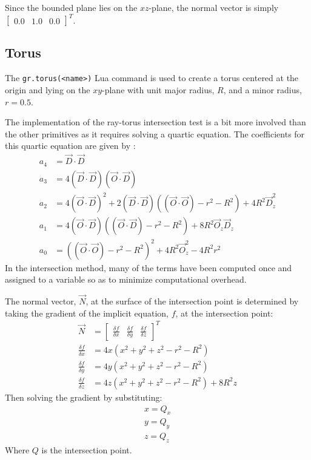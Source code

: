 Since the bounded plane lies on the $xz$-plane, the normal vector is simply
$\begin{bmatrix} 0.0 & 1.0 & 0.0
\end{bmatrix}^{T}$.

\subsection*{Torus}
The \verb|gr.torus(<name>)| Lua command is used to create a torus centered at
the origin and lying on the $xy$-plane with unit major radius, $R$, and a minor 
radius, $r = 0.5$.

The implementation of the ray-torus intersection test is a bit more involved
than the other primitives as it requires solving a quartic equation. The
coefficients for this quartic equation are given by \cite{13_wagner_2004}:
\begin{equation}
\begin{split}
  a_{4} &= \vec{D}\cdot\vec{D} \\
  a_{3} &= 4(\vec{D}\cdot\vec{D})(\vec{O}\cdot\vec{D}) \\
  a_{2} &= 4(\vec{O}\cdot\vec{D})^2 + 2(\vec{D}\cdot\vec{D})((\vec{O}\cdot
  \vec{O}) - r^2 - R^2) + 4R^2\vec{D}_{z}^2 \\
  a_{1} &= 4(\vec{O}\cdot\vec{D})((\vec{O}\cdot\vec{D}) - r^2 - R^2) +8R^2
  \vec{O}_{z}\vec{D}_{z} \\
  a_{0} &= ((\vec{O}\cdot\vec{O}) - r^2 - R^2)^2 + 4R^2\vec{O}_{z}^2 - 4R^2r^2
\end{split}
\end{equation}
In the intersection method, many of the terms have been computed once and
assigned to a variable so as to minimize computational overhead.

The normal vector, $\vec{N}$, at the surface of the intersection point is 
determined by taking the gradient of the implicit equation, $f$, at the 
intersection point:
\begin{equation}
\begin{split}
  \vec{N} &= \begin{bmatrix} \frac{\delta f}{\delta x} & \frac{\delta f}{\delta
  y} & \frac{\delta f}{\delta z}
  \end{bmatrix}^{T} \\
  \frac{\delta f}{\delta x} &= 4x(x^2 + y^2 + z^2 - r^2 - R^2) \\
  \frac{\delta f}{\delta y} &= 4y(x^2 + y^2 + z^2 - r^2 - R^2) \\
  \frac{\delta f}{\delta z} &= 4z(x^2 + y^2 + z^2 - r^2 - R^2) + 8R^2z
\end{split}
\end{equation}
Then solving the gradient by substituting:
\begin{equation}
\begin{split}
  x = Q_{x} \\
  y = Q_{y} \\
  z = Q_{z}
\end{split}
\end{equation}
Where $Q$ is the intersection point.

